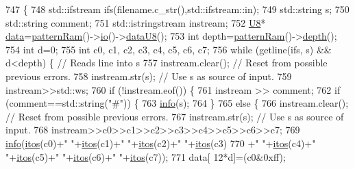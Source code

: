 \begin{DoxyCode}
747                                         \{
748   std::ifstream ifs(filename.c\_str(),std::ifstream::in);
749   std::string s;
750   std::string comment;
751   std::istringstream instream;
752   \hyperlink{ICECALv3_8h_a3cb25ca6f51f003950f9625ff05536fc}{U8}* \hyperlink{namespaceshell_a5ea2525995cedc3efd69ea8a7f034d1e}{data}=\hyperlink{classA3PE_a94ef54086baa29f7f6638c13d8906e56}{patternRam}()->\hyperlink{classIOobject_af04fb94137c3d86849f478ac5afab5d1}{io}()->\hyperlink{classIOdata_a75e9c318dbac3a39402179070943d4bc}{dataU8}();
753   \textcolor{keywordtype}{int} depth=\hyperlink{classA3PE_a94ef54086baa29f7f6638c13d8906e56}{patternRam}()->\hyperlink{classRAM_aa36cbedb8a970a01ee07a9637553887f}{depth}();
754   \textcolor{keywordtype}{int} d=0;
755   \textcolor{keywordtype}{int} c0, c1, c2, c3, c4, c5, c6, c7;
756   \textcolor{keywordflow}{while} (getline(ifs, s) && d<depth) \{ \textcolor{comment}{// Reads line into s}
757       instream.clear();     \textcolor{comment}{// Reset from possible previous errors.}
758       instream.str(s);      \textcolor{comment}{// Use s as source of input.}
759       instream>>std::ws;
760       \textcolor{keywordflow}{if} (!instream.eof()) \{
761         instream >> comment;
762         \textcolor{keywordflow}{if} (comment==std::string(\textcolor{stringliteral}{"#"})) \{
763           \hyperlink{classObject_a644fd329ea4cb85f54fa6846484b84a8}{info}(s);
764         \}
765         \textcolor{keywordflow}{else} \{
766           instream.clear();     \textcolor{comment}{// Reset from possible previous errors.}
767           instream.str(s);      \textcolor{comment}{// Use s as source of input.}
768           instream>>c0>>c1>>c2>>c3>>c4>>c5>>c6>>c7;
769           \hyperlink{classObject_a644fd329ea4cb85f54fa6846484b84a8}{info}(\hyperlink{Tools_8h_af330027dbdafb9a30768b3613c553e60}{itos}(c0)+\textcolor{stringliteral}{" "}+\hyperlink{Tools_8h_af330027dbdafb9a30768b3613c553e60}{itos}(c1)+\textcolor{stringliteral}{" "}+\hyperlink{Tools_8h_af330027dbdafb9a30768b3613c553e60}{itos}(c2)+\textcolor{stringliteral}{" "}+\hyperlink{Tools_8h_af330027dbdafb9a30768b3613c553e60}{itos}(c3)
770               +\textcolor{stringliteral}{" "}+\hyperlink{Tools_8h_af330027dbdafb9a30768b3613c553e60}{itos}(c4)+\textcolor{stringliteral}{" "}+\hyperlink{Tools_8h_af330027dbdafb9a30768b3613c553e60}{itos}(c5)+\textcolor{stringliteral}{" "}+\hyperlink{Tools_8h_af330027dbdafb9a30768b3613c553e60}{itos}(c6)+\textcolor{stringliteral}{" "}+\hyperlink{Tools_8h_af330027dbdafb9a30768b3613c553e60}{itos}(c7));
771           data[   12*d]=(c0&0xff);

\end{DoxyCode}
